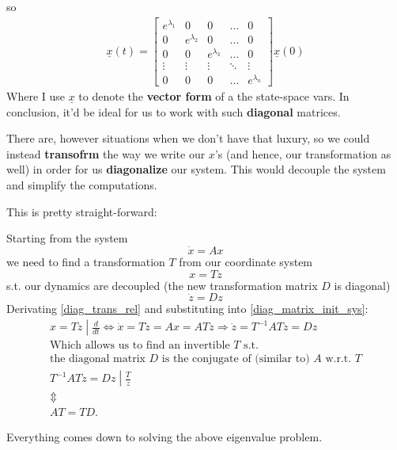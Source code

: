 so
\begin{align*}
  \underline{x}(t) =
  \begin{bmatrix}
    e^{\lambda_1} & 0 & 0 &\dots & 0 \\
    0 & e^{\lambda_2} & 0 & \dots & 0 \\
    0 & 0 & e^{\lambda_3} & \dots & 0 \\
    \vdots & \vdots & \vdots & \ddots & \vdots \\
    0 & 0 & 0 & \dots & e^{\lambda_n}
  \end{bmatrix}
  \underline{x}(0)
\end{align*}
Where I use $\underline{x}$ to denote the \textbf{vector form} of a the state-space vars.
In conclusion, it'd be ideal for us to work with such \textbf{diagonal} matrices.

There are, however situations when we don't have that luxury, so we could instead \textbf{transofrm} the way we write our $x$'s (and hence, our transformation as well) in order for us \textbf{diagonalize} our system. This would decouple the system and simplify the computations.

This is pretty straight-forward:

Starting from the system
\begin{equation}\label{diag_matrix_init_sys}
  \dot{x} = A x
\end{equation}
we need to find a transformation $T$ from our coordinate system
\begin{equation}\label{diag_trans_rel}
  x = Tz
\end{equation}
s.t. our dynamics are decoupled (the new transformation matrix $D$ is diagonal)
\[
  \dot{z} = Dz
\]
Derivating \ref{diag_trans_rel} and substituting into \ref{diag_matrix_init_sys}:
\begin{gather*}
  \left. x = Tz \middle| \frac{d}{dt} \right. \iff
  \dot{x} = T\dot{z} = Ax = ATz \Rightarrow \dot{z} = T^{-1} A T z = Dz \\
  \text{Which allows us to find an invertible } T \text{ s.t.} \\
  \text{the diagonal matrix } D \text{ is the conjugate of (similar to) } A \text{ w.r.t. } T \\
  \left. T^{-1} A T z = Dz \middle| \frac{T}{z}
  \right. \\
  \Updownarrow \\
  A T = T D.
\end{gather*}

Everything comes down to solving the above eigenvalue problem.

